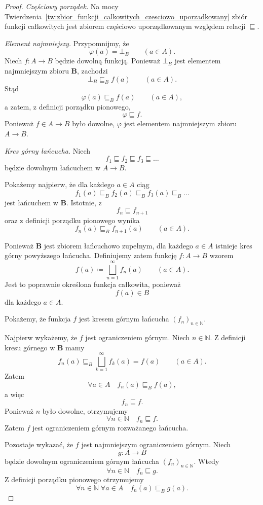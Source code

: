 \documentclass[11pt,a4paper]{article}
\theoremstyle{definition}
\theoremstyle{plain}
\newcommand{\bt}{\bot}                            %
\begin{document}
\begin{proof}
	\emph{Częściowy porządek.} Na mocy Twierdzenia~\ref{tw:zbior_funkcji_calkowitych_czesciowo_uporzadkowany} zbiór funkcji całkowitych jest zbiorem częściowo uporządkowanym względem relacji $\sqsubseteq$. 
	
	\emph{Element najmniejszy.}
	Przypomnijmy, że
	\[
	\varphi(a)= \bt_B
	\qquad(a\in A).
	\]
	Niech $f:A\to B$ będzie dowolną funkcją. Ponieważ $\bt_B$ jest
	elementem najmniejszym zbioru $\boldsymbol{B}$, zachodzi
	\[
	\bt_B\sqsubseteq_B f(a)
	\qquad(a\in A).
	\]
	Stąd
	\[
	\varphi(a)\sqsubseteq_B f(a)
	\qquad(a\in A),
	\]
	a zatem, z definicji porządku pionowego,
	\[
	\varphi\sqsubseteq f.
	\]
	Ponieważ $f\in A\to B$ było dowolne, $\varphi$ jest elementem
	najmniejszym zbioru $A\to B$.
	
	\emph{Kres górny łańcucha.}
	Niech
	\[
	f_1\sqsubseteq f_2\sqsubseteq f_3\sqsubseteq\ldots
	\]
	będzie dowolnym łańcuchem w $A\to B$.
	
	Pokażemy najpierw, że dla każdego $a\in A$ ciąg
	\[
	f_1(a)\sqsubseteq_B f_2(a)\sqsubseteq_B f_3(a)\sqsubseteq_B\ldots
	\]
	jest łańcuchem w $\boldsymbol{B}$. Istotnie, z
	\[
	f_n\sqsubseteq f_{n+1}
	\]
	oraz z definicji porządku pionowego wynika
	\[
	f_n(a)\sqsubseteq_B f_{n+1}(a)
	\qquad(a\in A).
	\]
	
	Ponieważ $\boldsymbol{B}$ jest zbiorem łańcuchowo zupełnym, dla każdego
	$a\in A$ istnieje kres górny powyższego łańcucha. Definiujemy zatem
	funkcję $f:A\to B$ wzorem
	\[
	f(a)
	\coloneqq
	\bigsqcup_{n=1}^{\infty}f_n(a)
	\qquad(a\in A).
	\]
	Jest to poprawnie określona funkcja całkowita, ponieważ
	\[
	f(a)\in B
	\]
	dla każdego $a\in A$.
	
	Pokażemy, że funkcja $f$ jest kresem górnym łańcucha
	$(f_n)_{n\in\mathbb{N}}$.
	
	Najpierw wykażemy, że $f$ jest ograniczeniem górnym. Niech
	$n\in\mathbb{N}$. Z definicji kresu górnego w $\boldsymbol{B}$ mamy
	\[
	f_n(a)
	\sqsubseteq_B
	\bigsqcup_{k=1}^{\infty}f_k(a)
	=
	f(a)
	\qquad(a\in A).
	\]
	Zatem
	\[
	\forall a\in A\quad f_n(a)\sqsubseteq_B f(a),
	\]
	a więc
	\[
	f_n\sqsubseteq f.
	\]
	Ponieważ $n$ było dowolne, otrzymujemy
	\[
	\forall n\in\mathbb{N}\quad f_n\sqsubseteq f.
	\]
	Zatem $f$ jest ograniczeniem górnym rozważanego łańcucha.
	
	Pozostaje wykazać, że $f$ jest najmniejszym ograniczeniem górnym.
	Niech
	\[
	g:A\to B
	\]
	będzie dowolnym ograniczeniem górnym łańcucha $(f_n)_{n\in\mathbb{N}}$.
	Wtedy
	\[
	\forall n\in\mathbb{N}\quad f_n\sqsubseteq g.
	\]
	Z definicji porządku pionowego otrzymujemy
	\[
	\forall n\in\mathbb{N}\;\forall a\in A\quad
	f_n(a)\sqsubseteq_B g(a).
	\]
	

\end{proof}
\end{document}
